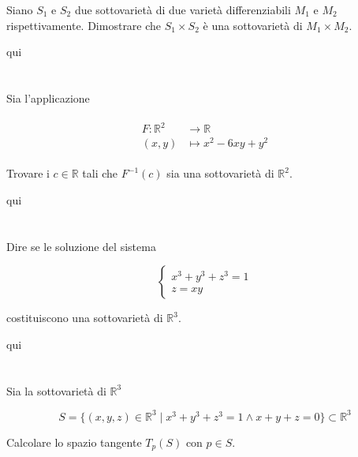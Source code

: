 \begin{tcolorbox}
	Siano $ S_{1} $ e $ S_{2} $ due sottovarietà di due varietà differenziabili $ M_{1} $ e $ M_{2} $ rispettivamente. Dimostrare che $ S_{1} \times S_{2} $ è una sottovarietà di $ M_{1} \times M_{2} $.
\end{tcolorbox}

qui

\tocless\section{}\label{es2-13}

\begin{tcolorbox}
	Sia l'applicazione
	
	\begin{align}
		\begin{split}
			F : \mathbb{R}^{2} &\to \mathbb{R}\\
			(x,y) &\mapsto x^{2}-6xy+y^{2}
		\end{split}
	\end{align}

	Trovare i $ c \in \mathbb{R} $ tali che $ F^{-1}(c) $ sia una sottovarietà di $ \mathbb{R}^{2} $.
\end{tcolorbox}

qui

\tocless\section{}\label{es2-14}

\begin{tcolorbox}
	Dire se le soluzione del sistema
	
	\begin{equation}
		\begin{cases}
			x^{3} + y^{3} + z^{3} = 1\\
			z = xy
		\end{cases}
	\end{equation}

	costituiscono una sottovarietà di $ \mathbb{R}^{3} $.
\end{tcolorbox}

qui

\tocless\section{}\label{BONUS2-3}

\begin{tcolorbox}
	Sia la sottovarietà di $ \mathbb{R}^{3} $
	
	\begin{equation}
		S = \{ (x,y,z) \in \mathbb{R}^{3} \mid x^{3} + y^{3} + z^{3} = 1 \wedge x+y+z=0 \} \subset \mathbb{R}^{3}
	\end{equation}
	
	Calcolare lo spazio tangente $ T_{p}(S) $ con $ p \in S $.
\end{tcolorbox}

